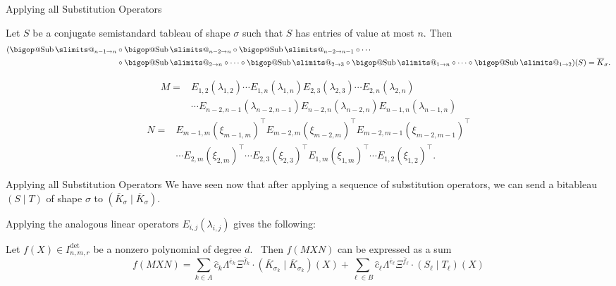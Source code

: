 \documentclass[aspectratio=169]{beamer}
\makeatletter
\DeclareRobustCommand\bigop[1]{%
  \mathop{\vphantom{\cdot}\mathpalette\bigop@{#1}}\slimits@
}
\newcommand{\bigop@}[2]{%
  \vcenter{%
    \sbox\z@{$#1\sum$}%
    \hbox{\resizebox{\ifx#1\displaystyle.9\fi\dimexpr\ht\z@+\dp\z@}{!}{$\m@th#2$}}%
  }%
}
\newcommand{\Sub}{\DOTSB\bigop{\mathrm{Sub}}}
\makeatother
\begin{document}
\begin{frame}{Applying all Substitution Operators}
  \vspace{10pt}
    \begin{lem}
        Let $S$ be a conjugate semistandard tableau of shape $\sigma$ such that $S$ has entries of value at most $n$.
        Then
        \begin{align*}
          (\Sub_{n - 1 \to n} &\circ \Sub_{n - 2 \to n} \circ \Sub_{n - 2 \to n-1} \circ \cdots \\
          &\circ \Sub_{2 \to n}\circ\cdots\circ\Sub_{2 \to 3} \circ \Sub_{1 \to n} \circ \cdots \circ \Sub_{1 \to 2})(S) = \overline{K}_\sigma.
        \end{align*}
    \end{lem}

    \pause
    \vspace{-20pt}

    \begin{align*}
      M ={}& E_{1, 2}(\lambda_{1, 2}) \cdots E_{1, n}(\lambda_{1, n}) E_{2, 3}(\lambda_{2, 3}) \cdots E_{2, n}(\lambda_{2, n}) \\
           &\cdots E_{n - 2, n - 1}(\lambda_{n - 2, n - 1}) E_{n - 2, n}(\lambda_{n - 2, n}) E_{n - 1, n}(\lambda_{n - 1, n})
    \end{align*}
    \begin{align*}
      N ={}& E_{m - 1, m}(\xi_{m - 1, m})^{\top} E_{m - 2, m}(\xi_{m - 2, m})^\top E_{m - 2, m - 1}(\xi_{m - 2, m - 1})^\top \\ &
                                                                                                                                  \cdots E_{2, m}(\xi_{2, m})^{\top} \cdots E_{2, 3}(\xi_{2, 3})^\top E_{1, m}(\xi_{1, m})^\top \cdots E_{1, 2}(\xi_{1, 2})^\top.
    \end{align*}
\end{frame}

\begin{frame}{Applying all Substitution Operators}
    We have seen now that after applying a sequence of substitution operators, we can send a bitableau $(S \mid T)$ of shape $\sigma$ to $(\overline{K}_\sigma \mid \overline{K}_\sigma)$.

    \pause
    \vspace{10pt}

    Applying the analogous linear operators $E_{i, j}(\lambda_{i, j})$ gives the following: \pause
    \begin{lem}[{\cite[Lemma 3.9]{DG25}}]
      Let $f(X) \in I^{\det}_{n, m, r}$ be a nonzero polynomial of degree $d$.\ \pause
      Then $f(MXN)$ can be expressed as a sum
      \begin{equation*}
        f(MXN) = \sum_{k \in A} \widehat{c}_{k} \Lambda^{\overline{e}_k}\Xi^{\overline{f}_k}\cdot (\overline{K}_{\sigma_k}\mid \overline{K}_{\sigma_k})(X) + \sum_{\ell \in B} \widehat{c}_{\ell} \Lambda^{\overline{e}_\ell}\Xi^{\overline{f}_\ell}\cdot (S_\ell\mid T_\ell)(X)
      \end{equation*}
    \end{lem}
\end{frame}
\end{document}
